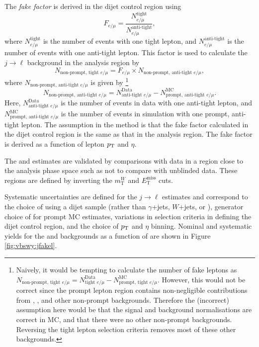 The \textit{fake factor} is derived in the dijet control region using 
\begin{equation}
  F_{e/\mu}=\frac{N_{e/\mu}^{\text{tight}}}{N_{e/\mu}^{\text{anti-tight}}},
\end{equation}
where $N_{e/\mu}^{\text{tight}}$ is the number of events with one tight lepton, and $N_{e/\mu}^{\text{anti-tight}}$ is the number of events with one anti-tight lepton. This factor is used to calculate the $j\rightarrow\ell$ background in the analysis region by
\begin{equation}\label{eq:fakefactor}
  N_{\text{non-prompt, tight }e/\mu} = F_{e/\mu}\times N_{\text{non-prompt, anti-tight } e/\mu},
\end{equation} 
where $N_{\text{non-prompt, anti-tight } e/\mu}$ is given by \footnote{Naively, it would be tempting to calculate the number of fake leptons as $N_{\text{non-prompt, tight } e/\mu} = N^{\text{Data}}_{\text{tight }e/\mu} - N^{\text{MC}}_{\text{prompt, tight } e/\mu}$. However, this would not be correct since the prompt lepton region contains non-negligible contributions from \ewwy, \qcdwy, and other non-prompt backgrounds. Therefore the (incorrect) assumption here would be that the signal and background normalisations are correct in MC, and that there were no other non-prompt backgrounds. Reversing the tight lepton selection criteria removes most of these other backgrounds.}
\begin{equation}
  N_{\text{non-prompt, anti-tight } e/\mu} = N^{\text{Data}}_{\text{anti-tight }e/\mu} - N^{\text{MC}}_{\text{prompt, anti-tight } e/\mu}. 
\end{equation}
Here, $N^{\text{Data}}_{\text{anti-tight }e/\mu}$ is the number of events in data with one anti-tight lepton, and $N^{\text{MC}}_{\text{prompt, anti-tight } e/\mu}$ is the number of events in simulation with one prompt, anti-tight lepton. The assumption in the method is that the fake factor calculated in the dijet control region is the same as that in the analysis region. The fake factor is derived as a function of lepton $p_{\text{T}}$ and $\eta$.

The \jfakee and \jfakemu estimates are validated by comparisons with data in a region close to the analysis phase space such as not to compare with unblinded data. These regions are defined by inverting the $m_\text{T}^W$ and $E_\text{T}^{\text{miss}}$ cuts.

Systematic uncertainties are defined for the $j\rightarrow\ell$ estimates and correspond to the choice of using a dijet sample (rather than $\gamma$+jets, $W$+jets, or \zjets), generator choice of for prompt MC estimates, variations in selection criteria in defining the dijet control region, and the choice of $p_{\text{T}}$ and $\eta$ binning. Nominal and systematic yields for the \jfakee and \jfakemu backgrounds as a function of \mjj are shown in Figure \ref{fig:vbswy:jfakel}.

